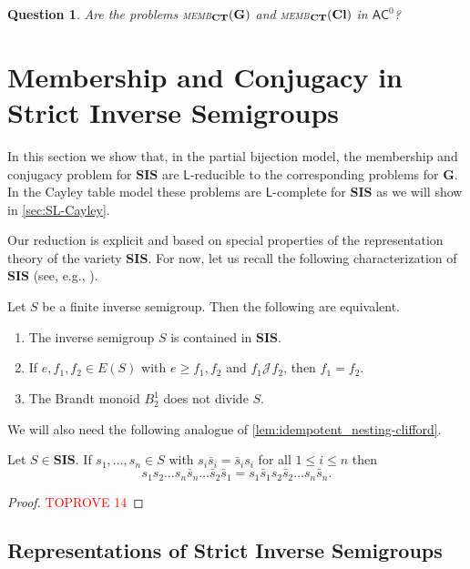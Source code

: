 \documentclass[anonymous,letter,UKenglish,cleveref,autoref,thm-restate]{lipics-v2021}
\renewcommand{\geq}{\geqslant}
\renewcommand{\leq}{\leqslant}
\newcommand{\ACz}{\ensuremath{\mathsf{AC}^0}\xspace}
\newcommand{\LOGSPACE}{\ensuremath{\mathsf{L}}\xspace}
\newcommand{\vG}{\ensuremath{\mathbf{G}}}
\newcommand{\vCl}{\ensuremath{\mathbf{Cl}}}
\newcommand{\vSI}{\ensuremath{\mathbf{SIS}}}
\newcommand*{\gJ}[1][]{\mathrel{\mathcal{J}_{#1}}}
\theoremstyle{plain}
\newtheorem{question}[theorem]{Question}
\theoremstyle{plain}
\newcommand{\dMemb}[2][]{\textup{\textsc{memb${}_{\mathbf{#1}}\expandafter\ifx\expandafter\relax\detokenize{#2}\relax\else(#2)\fi$}}}
\begin{document}
\begin{question}
  Are the problems \dMemb[CT]{\vG} and  \dMemb[CT]{\vCl} in \ACz?
\end{question}


\section{Membership and Conjugacy in Strict Inverse Semigroups}

In this section we show that, in the partial bijection model, the membership and conjugacy problem for $\vSI$ are \LOGSPACE-reducible to the corresponding problems for $\vG$.
In the Cayley table model these problems are \LOGSPACE-complete for $\vSI$ as we will show in \cref{sec:SL-Cayley}.

Our reduction is explicit and based on special properties of the representation theory of the variety $\vSI$.
For now, let us recall the following characterization of $\vSI$ (see, e.g., \cite{HallJohnston89}).

\begin{lemma}\label{lem:gb-characterization}
  Let $S$ be a finite inverse semigroup.
  Then the following are equivalent.
  \begin{enumerate}
    \item The inverse semigroup $S$ is contained in $\vSI$.
    \item If $e,f_1,f_2 \in E(S)$ with $e \geq f_1, f_2$ and $f_1 \gJ f_2$, then $f_1 = f_2$.
    \item The Brandt monoid $B^1_2$ does not divide $S$.
  \end{enumerate}
\end{lemma}

We will also need the following analogue of \cref{lem:idempotent_nesting-clifford}.

\begin{lemma}\label{lem:gb-idempotent_nesting}
	Let $S \in \vSI$.
	If $s_1, \dotsc, s_n \in S$ with $s_i \bar s_i = \bar s_i s_i$ for all $1 \leq i \leq n$ then 
	\[
	s_1 s_2 \dotsc s_n \bar s_n \dotsc \bar s_2 \bar s_1 = s_1 \bar s_1 s_2 \bar s_2 \dotsc s_n \bar s_n.
	\]
\end{lemma}
\begin{proof}\textcolor{red}{TOPROVE 14}\end{proof}



\subsection{Representations of Strict Inverse Semigroups}\label{sub:munn}
\end{document}
